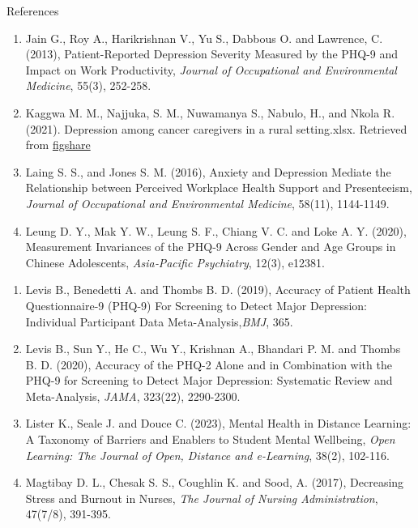 \documentclass{beamer}
\newcounter{saveenumi}
\newcommand{\seti}{\setcounter{saveenumi}{\value{enumi}}}
\newcommand{\conti}{\setcounter{enumi}{\value{saveenumi}}}
\numberwithin{equation}{section}
\numberwithin{table}{section}
\begin{document}
\begin{frame}{References}
	\begin{enumerate}
\item Jain G., Roy A., Harikrishnan V., Yu S., Dabbous O. and Lawrence, C. (2013), Patient-Reported Depression Severity Measured by the PHQ-9 and Impact on Work Productivity, \emph{Journal of Occupational and Environmental Medicine}, 55(3), 252-258.
\item Kaggwa M. M., Najjuka, S. M., Nuwamanya S., Nabulo, H., and Nkola R. (2021). Depression among cancer caregivers in a rural setting.xlsx. Retrieved from
\href{https://figshare.com/articles/dataset/Depressionamongcancercaregiversinaruralsettingxlsx/doi: 10.6084/m9.figshare.14524800.v1}{figshare}

\item Laing S. S., and Jones S. M. (2016), Anxiety and Depression Mediate the Relationship between Perceived Workplace Health Support and Presenteeism, \emph{Journal of Occupational and Environmental Medicine}, 58(11), 1144-1149.

\item Leung D. Y., Mak Y. W., Leung S. F., Chiang V. C. and Loke A. Y. (2020), Measurement Invariances of the PHQ‐9 Across Gender and Age Groups in Chinese Adolescents,\emph{ Asia‐Pacific Psychiatry}, 12(3), e12381.
\seti
\end{enumerate}
\end{frame}
\begin{frame}
	\begin{enumerate}
		\conti
\item Levis B., Benedetti A. and Thombs B. D. (2019), Accuracy of Patient Health Questionnaire-9 (PHQ-9) For Screening to Detect Major Depression: Individual Participant Data Meta-Analysis,\emph{BMJ}, 365.

\item Levis B., Sun Y., He C., Wu Y., Krishnan A., Bhandari P. M. and Thombs B. D. (2020), Accuracy of the PHQ-2 Alone and in Combination with the PHQ-9 for Screening to Detect Major Depression: Systematic Review and Meta-Analysis,\emph{ JAMA}, 323(22), 2290-2300.

\item Lister K., Seale J. and Douce C. (2023), Mental Health in Distance Learning: A Taxonomy of Barriers and Enablers to Student Mental Wellbeing, \emph{Open Learning: The Journal of Open, Distance and e-Learning}, 38(2), 102-116.

\item Magtibay D. L., Chesak S. S., Coughlin K. and Sood, A. (2017), Decreasing Stress and Burnout in Nurses, \emph{The Journal of Nursing Administration}, 47(7/8), 391-395.

\seti
	\end{enumerate}
\end{frame}
\end{document}
